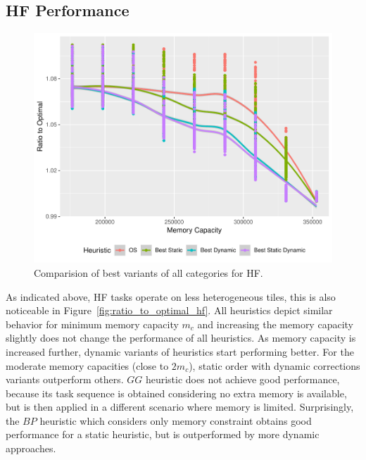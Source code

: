 \documentclass[runningheads]{llncs} %
\begin{document}
	\subsection{HF Performance}	
	
	\begin{figure}[htb]
	\begin{center}
		\includegraphics[scale=0.7]{./ratio_to_optimal_hf-best.pdf}
		\caption{Comparision of best variants of all categories for HF.}
		\label{fig:ratio_to_optimal_best_hf}
	\end{center}
	\end{figure}
	
		As indicated above, HF tasks operate on less heterogeneous tiles, this is also noticeable in Figure~\ref{fig:ratio_to_optimal_hf}. All heuristics depict similar behavior for minimum memory capacity $m_c$ and increasing the memory capacity slightly does not change the performance of all heuristics. As memory capacity is increased further, dynamic variants of heuristics start performing better. For the moderate memory capacities (close to $2m_c$), static order with dynamic corrections variants outperform others. $GG$ heuristic does not achieve good performance, because its task sequence is obtained considering no extra memory is available, but is then applied in a different scenario where memory is limited. Surprisingly, the $BP$ heuristic which considers only memory constraint obtains good performance for a static heuristic, but is outperformed by more dynamic approaches.

	
		
\end{document}
